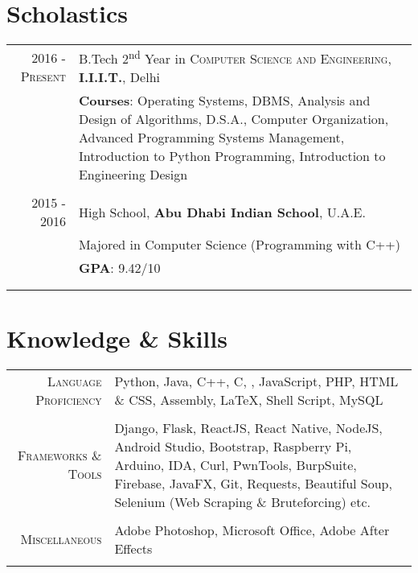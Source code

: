 \documentclass[a4paper,10pt]{article}
\begin{document}
\section{Scholastics}
\begin{tabular}{r|p{13.6cm}}
 \textsc{2016 - Present} & B.Tech 2\textsuperscript{nd} Year in \textsc{Computer Science and Engineering}, \textbf{I.I.I.T.}, Delhi\\
& \textbf{Courses}: Operating Systems, DBMS, Analysis and Design of Algorithms, D.S.A., Computer Organization, Advanced Programming
    Systems Management, Introduction to Python Programming, Introduction to Engineering Design\\\multicolumn{1}{c}{}\\
\textsc{2015 - 2016}& High School, \normalsize\textbf{Abu Dhabi Indian School}, U.A.E.\\
& Majored in Computer Science (Programming with C++) \\
&\normalsize \textbf{GPA}: 9.42/10\\&\\\multicolumn{1}{c}{}\\
\end{tabular}

\section{Knowledge \& Skills}
\begin{tabular}{r|p{12.5cm}}
 \textsc{Language Proficiency} & Python, Java, C++, C, , JavaScript, PHP, HTML \& CSS, Assembly, LaTeX, Shell Script, MySQL\\\multicolumn{1}{c}{}\\
 \textsc{Frameworks \& Tools} & Django, Flask, ReactJS, React Native, NodeJS, Android Studio, Bootstrap, Raspberry Pi, Arduino, IDA, Curl, PwnTools, BurpSuite, Firebase, JavaFX, Git, Requests, Beautiful Soup, Selenium (Web Scraping \& Bruteforcing) etc.\\\multicolumn{1}{c}{}\\
 \textsc{Miscellaneous} & Adobe Photoshop, Microsoft Office, Adobe After Effects\\\multicolumn{1}{c}{}
\end{tabular}
\end{document}
